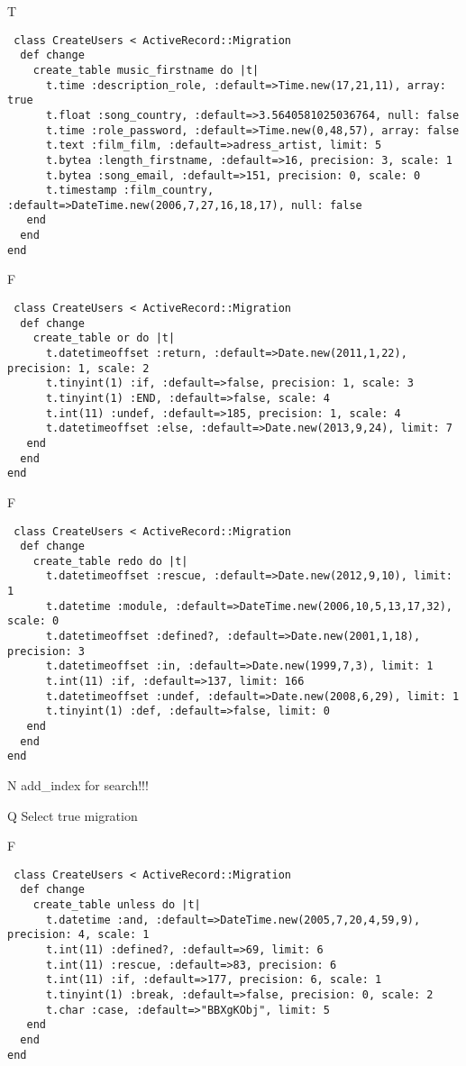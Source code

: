 T
\begin{verbatim}
 class CreateUsers < ActiveRecord::Migration 
  def change 
    create_table music_firstname do |t| 
      t.time :description_role, :default=>Time.new(17,21,11), array: true
      t.float :song_country, :default=>3.5640581025036764, null: false
      t.time :role_password, :default=>Time.new(0,48,57), array: false
      t.text :film_film, :default=>adress_artist, limit: 5
      t.bytea :length_firstname, :default=>16, precision: 3, scale: 1
      t.bytea :song_email, :default=>151, precision: 0, scale: 0
      t.timestamp :film_country, :default=>DateTime.new(2006,7,27,16,18,17), null: false
   end 
  end 
end
\end{verbatim}

F
\begin{verbatim}
 class CreateUsers < ActiveRecord::Migration 
  def change 
    create_table or do |t| 
      t.datetimeoffset :return, :default=>Date.new(2011,1,22), precision: 1, scale: 2
      t.tinyint(1) :if, :default=>false, precision: 1, scale: 3
      t.tinyint(1) :END, :default=>false, scale: 4
      t.int(11) :undef, :default=>185, precision: 1, scale: 4
      t.datetimeoffset :else, :default=>Date.new(2013,9,24), limit: 7
   end 
  end 
end
\end{verbatim}

F
\begin{verbatim}
 class CreateUsers < ActiveRecord::Migration 
  def change 
    create_table redo do |t| 
      t.datetimeoffset :rescue, :default=>Date.new(2012,9,10), limit: 1
      t.datetime :module, :default=>DateTime.new(2006,10,5,13,17,32), scale: 0
      t.datetimeoffset :defined?, :default=>Date.new(2001,1,18), precision: 3
      t.datetimeoffset :in, :default=>Date.new(1999,7,3), limit: 1
      t.int(11) :if, :default=>137, limit: 166
      t.datetimeoffset :undef, :default=>Date.new(2008,6,29), limit: 1
      t.tinyint(1) :def, :default=>false, limit: 0
   end 
  end 
end
\end{verbatim}
N
add_index for search!!!
  
Q
Select true migration

F
\begin{verbatim}
 class CreateUsers < ActiveRecord::Migration 
  def change 
    create_table unless do |t| 
      t.datetime :and, :default=>DateTime.new(2005,7,20,4,59,9), precision: 4, scale: 1
      t.int(11) :defined?, :default=>69, limit: 6
      t.int(11) :rescue, :default=>83, precision: 6
      t.int(11) :if, :default=>177, precision: 6, scale: 1
      t.tinyint(1) :break, :default=>false, precision: 0, scale: 2
      t.char :case, :default=>"BBXgKObj", limit: 5
   end 
  end 
end
\end{verbatim}

